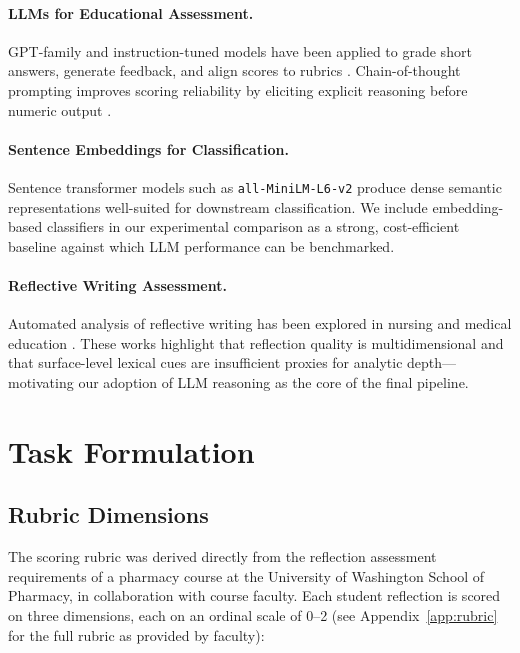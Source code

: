 \documentclass[11pt]{article}
\begin{document}
\paragraph{LLMs for Educational Assessment.}
GPT-family and instruction-tuned models have been applied to grade short answers, generate feedback, and align scores to rubrics \citep{kortemeyer2023could, mizumoto2023exploring}. Chain-of-thought prompting improves scoring reliability by eliciting explicit reasoning before numeric output \citep{wei2022chain}.

\paragraph{Sentence Embeddings for Classification.}
Sentence transformer models such as \texttt{all-MiniLM-L6-v2} \citep{reimers2019sentence} produce dense semantic representations well-suited for downstream classification. We include embedding-based classifiers in our experimental comparison as a strong, cost-efficient baseline against which LLM performance can be benchmarked.

\paragraph{Reflective Writing Assessment.}
Automated analysis of reflective writing has been explored in nursing \citep{song2022automated} and medical education \citep{kennedy2014reflection}. These works highlight that reflection quality is multidimensional and that surface-level lexical cues are insufficient proxies for analytic depth—motivating our adoption of LLM reasoning as the core of the final pipeline.

\section{Task Formulation}

\subsection{Rubric Dimensions}

The scoring rubric was derived directly from the reflection assessment requirements of a pharmacy course at the University of Washington School of Pharmacy, in collaboration with course faculty. Each student reflection is scored on three dimensions, each on an ordinal scale of 0--2 (see Appendix~\ref{app:rubric} for the full rubric as provided by faculty):
\end{document}
